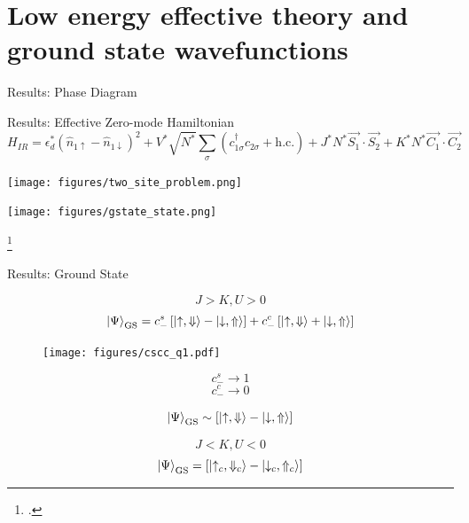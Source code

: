 \documentclass[aspectratio=169]{beamer}
\newcommand{\cen}[1]{\begin{center}{#1}\end{center}}
\begin{document}
\section{Low energy effective theory and ground state wavefunctions}
\begin{frame}[noframenumbering]{Results: Phase Diagram}
\cen{
	\hspace*{-50pt}\def\svgwidth{0.8\columnwidth}
	
}
\end{frame}


\begin{frame}[noframenumbering]{Results: Effective Zero-mode Hamiltonian}
	\vspace*{-30pt}
	\[H_{IR} = \epsilon_d^* \left( \hat n_{1 \uparrow} - \hat n_{1 \downarrow} \right) ^2 + V^*\sqrt{N^*}\sum_{\sigma}\left(c^\dagger_{1\sigma}c_{2\sigma} + \text{h.c.} \right) + J^*N^*\vec{S_1}\cdot\vec{S_2} + K^*N^*\vec{C_1}\cdot\vec{C_2}\]
\hspace*{-15pt}
	\begin{minipage}{0.5\textwidth}
	{\centering
	\texttt{[image: figures/two\_site\_problem.png]}}
\end{minipage}
\hspace*{25pt}
\begin{minipage}{0.45\textwidth}
	{\centering
	\texttt{[image: figures/gstate\_state.png]}}
\end{minipage}

\footcite{wilson,hrk-nrg,taraphder}

\end{frame}

\begin{frame}[noframenumbering]{Results: Ground State}
\begin{minipage}{0.65\textwidth}
	\[J > K, U>0\]
\vspace*{-10pt}
	\[\ket{\Psi}_\text{GS} = c_-^s\left[\ket{\uparrow, \Downarrow} - \ket{\downarrow, \Uparrow}\right] + c_-^c\left[\ket{\uparrow, \Downarrow} + \ket{\downarrow, \Uparrow}\right]\]

\vspace*{10pt}
\begin{minipage}{0.65\textwidth}
\begin{figure}[htpb]
	\centering
	\texttt{[image: figures/cscc\_q1.pdf]}
\end{figure}
\end{minipage}
\begin{minipage}{0.3\textwidth}
	\[ c_-^s \to 1\]
	\[ c_-^c \to 0\]
\end{minipage}
\[\ket{\Psi}_\text{GS} \sim \left[\ket{\uparrow, \Downarrow} - \ket{\downarrow, \Uparrow}\right]\]
\end{minipage}
\vline
\begin{minipage}{0.34\textwidth}
\[J < K, U<0\]
\[\ket{\Psi}_\text{GS} = \left[\ket{\uparrow_c, \Downarrow_c} - \ket{\downarrow_c, \Uparrow_c}\right]\]
\vspace*{0.6\textheight}
\end{minipage}
\end{frame}
\end{document}

